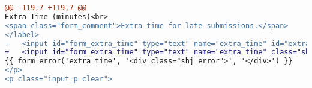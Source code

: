 \begin{lstlisting}[language=diff, caption=Perubahan pada \textit{file} \textit{add\_assignment.twig}, label=lst_4.1.1:1, basicstyle=\ttfamily, frame=single,
columns=fullflexible, keepspaces=true, breaklines=true]
@@ -119,7 +119,7 @@
Extra Time (minutes)<br>
<span class="form_comment">Extra time for late submissions.</span>
</label>
- 	<input id="form_extra_time" type="text" name="extra_time" id="extra_time" class="sharif_input medium" value="{{ edit ? edit_assignment.extra_time|extra_time_formatter : set_value('extra_time') }}" />
+ 	<input id="form_extra_time" type="text" name="extra_time" class="sharif_input medium" value="{{ edit ? edit_assignment.extra_time|extra_time_formatter : set_value('extra_time') }}" />
{{ form_error('extra_time', '<div class="shj_error">', '</div>') }}
</p>
<p class="input_p clear">
\end{lstlisting}
